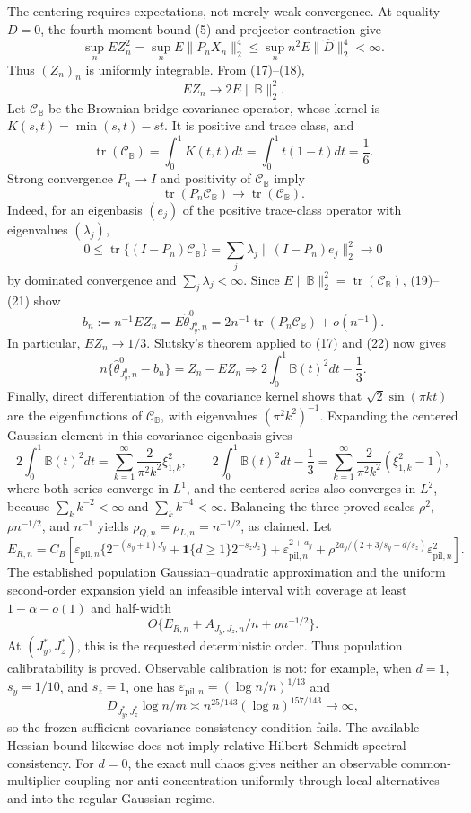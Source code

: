 The centering requires expectations, not merely weak convergence. At equality \(D=0\), the fourth-moment bound (5) and projector contraction give
\[
\sup_n E Z_n^2
=\sup_nE\|P_nX_n\|_2^4
\le\sup_n n^2E\|\widehat D\|_2^4<\infty. \tag{18}
\]
Thus \((Z_n)_n\) is uniformly integrable. From (17)--(18),
\[
EZ_n\longrightarrow2E\|\mathbb B\|_2^2. \tag{19}
\]
Let \(\mathcal C_{\mathbb B}\) be the Brownian-bridge covariance operator, whose kernel is \(K(s,t)=\min(s,t)-st\). It is positive and trace class, and
\[
\operatorname{tr}(\mathcal C_{\mathbb B})
=\int_0^1K(t,t)dt
=\int_0^1t(1-t)dt=\frac16. \tag{20}
\]
Strong convergence \(P_n\to I\) and positivity of \(\mathcal C_{\mathbb B}\) imply
\[
\operatorname{tr}(P_n\mathcal C_{\mathbb B})\to
\operatorname{tr}(\mathcal C_{\mathbb B}). \tag{21}
\]
Indeed, for an eigenbasis \((e_j)\) of the positive trace-class operator with eigenvalues \((\lambda_j)\),
\[
0\le\operatorname{tr}\{(I-P_n)\mathcal C_{\mathbb B}\}
=\sum_j\lambda_j\|(I-P_n)e_j\|_2^2\to0
\]
by dominated convergence and \(\sum_j\lambda_j<\infty\). Since \(E\|\mathbb B\|_2^2=\operatorname{tr}(\mathcal C_{\mathbb B})\), (19)--(21) show
\[
b_n:=n^{-1}EZ_n=E\widehat\theta^0_{J_y^0,n}
=2n^{-1}\operatorname{tr}(P_n\mathcal C_{\mathbb B})+o(n^{-1}). \tag{22}
\]
In particular, \(EZ_n\to1/3\). Slutsky's theorem applied to (17) and (22) now gives
\[
n\{\widehat\theta^0_{J_y^0,n}-b_n\}
=Z_n-EZ_n
\Rightarrow2\int_0^1\mathbb B(t)^2dt-\frac13. \tag{23}
\]
Finally, direct differentiation of the covariance kernel shows that \(\sqrt2\sin(\pi kt)\) are the eigenfunctions of \(\mathcal C_{\mathbb B}\), with eigenvalues \((\pi^2k^2)^{-1}\). Expanding the centered Gaussian element in this covariance eigenbasis gives
\[
2\int_0^1\mathbb B(t)^2dt
=\sum_{k=1}^{\infty}\frac{2}{\pi^2k^2}\xi_{1,k}^2,
\qquad
2\int_0^1\mathbb B(t)^2dt-\frac13
=\sum_{k=1}^{\infty}\frac{2}{\pi^2k^2}(\xi_{1,k}^2-1), \tag{24}
\]
where both series converge in \(L^1\), and the centered series also converges in \(L^2\), because \(\sum_k k^{-2}<\infty\) and \(\sum_k k^{-4}<\infty\). Balancing the three proved scales \(\rho^2\), \(\rho n^{-1/2}\), and \(n^{-1}\) yields \(\rho_{Q,n}=\rho_{L,n}=n^{-1/2}\), as claimed.
Let
\[
E_{R,n}=C_B\left[
\varepsilon_{\mathrm{pil},n}\{2^{-(s_y+1)J_y}+\mathbf 1\{d\ge1\}2^{-s_zJ_z}\}
+\varepsilon_{\mathrm{pil},n}^{2+a_y}
+\rho^{2a_y/(2+3/s_y+d/s_z)}\varepsilon_{\mathrm{pil},n}^2
\right].
\]
The established population Gaussian--quadratic approximation and the uniform second-order expansion yield an infeasible interval with coverage at least \(1-\alpha-o(1)\) and half-width
\[
O\{E_{R,n}+A_{J_y,J_z,n}/n+\rho n^{-1/2}\}.
\]
At \((J_y^*,J_z^*)\), this is the requested deterministic order. Thus population calibratability is proved. Observable calibration is not: for example, when \(d=1\), \(s_y=1/10\), and \(s_z=1\), one has \(\varepsilon_{\mathrm{pil},n}=(\log n/n)^{1/13}\) and
\[
D_{J_y^*,J_z^*}\log n/m
\asymp n^{25/143}(\log n)^{157/143}\to\infty,
\]
so the frozen sufficient covariance-consistency condition fails. The available Hessian bound likewise does not imply relative Hilbert--Schmidt spectral consistency. For \(d=0\), the exact null chaos gives neither an observable common-multiplier coupling nor anti-concentration uniformly through local alternatives and into the regular Gaussian regime.
